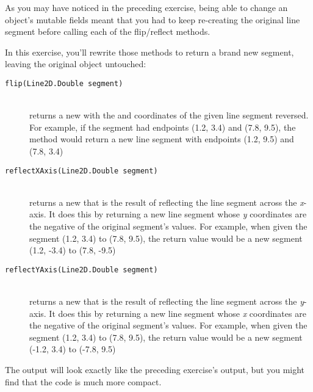 \begin{exercise}
As you may have noticed in the preceding exercise, being able to change an object's mutable fields meant that you had to keep re-creating the original line segment before calling each of the flip/reflect methods.

In this exercise, you'll rewrite those methods to return a brand new  segment, leaving the original object untouched:

\begin{description}
  \item[\texttt{flip(Line2D.Double segment)}] \hfill \\ returns a new  with the  and  coordinates of the given line segment reversed. For example, if the segment had endpoints (1.2, 3.4) and (7.8, 9.5), the method would return a new line segment with endpoints (1.2, 9.5) and (7.8, 3.4)
  \item[\texttt{reflectXAxis(Line2D.Double segment)}] \hfill \\ returns a new  that is the result of reflecting the line segment across the {\em x}-axis. It does this by returning a new line segment whose {\em y} coordinates are the negative of the original segment's values. For example, when given the segment (1.2, 3.4) to (7.8, 9.5), the return value would be a new segment (1.2, -3.4) to (7.8, -9.5)
  \item[\texttt{reflectYAxis(Line2D.Double segment)}] \hfill \\ returns a new  that is the result of reflecting the line segment across the {\em y}-axis. It does this by returning a new line segment whose {\em x} coordinates are the negative of the original segment's values.  For example, when given the segment (1.2, 3.4) to (7.8, 9.5), the return value would be a new segment (-1.2, 3.4) to (-7.8, 9.5)
\end{description}

The output will look exactly like the preceding exercise's output, but you might find that the code is much more compact.

\end{exercise}
